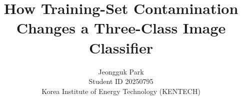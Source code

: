 \documentclass[10pt,twocolumn,letterpaper]{article}
\title{How Training-Set Contamination Changes a Three-Class Image Classifier}
\author{Jeongguk Park\\
Student ID 20250795\\
Korea Institute of Energy Technology (KENTECH)
}
\begin{document}
\maketitle





{
    \small
    
    
}
\end{document}

